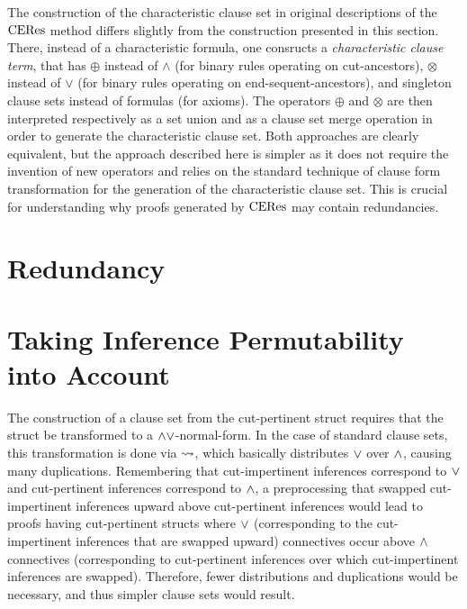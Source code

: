 \documentclass{llncs}
\begin{document}
The construction of the characteristic clause set in original descriptions of the $\mathrm{CERes}$ method \cite{BaazLeitsch1999MethodsofCut-Elimination,BaazLeitsch2000Cut-eliminationandRedundancy-eliminationbyResolution,BaazLeitsch2006Towardsaclausalanalysisofcut-elimination} differs slightly from the construction presented in this section. There, instead of a characteristic formula, one consructs a \emph{characteristic clause term}, that has $\oplus$ instead of $\wedge$ (for binary rules operating on cut-ancestors), $\otimes$ instead of $\vee$ (for binary rules operating on end-sequent-ancestors), and singleton clause sets instead of formulas (for axioms). The operators $\oplus$ and $\otimes$ are then interpreted respectively as a set union and as a clause set merge operation in order to generate the characteristic clause set. Both approaches are clearly equivalent, but the approach described here is simpler as it does not require the invention of new operators and relies on the standard technique of clause form transformation for the generation of the characteristic clause set. This is crucial for understanding why proofs generated by $\mathrm{CERes}$ may contain redundancies.


\section{Redundancy}
\label{sec:Redundancy}




\section{Taking Inference Permutability into Account}
\label{sec:InferencePermutability}

The construction of a clause set from the cut-pertinent struct requires that the struct be transformed to a $\wedge\vee$-normal-form. In the case of standard clause sets, this transformation is done via $\leadsto$, which basically distributes $\vee$ over $\wedge$, causing many duplications. Remembering that cut-impertinent inferences correspond to $\vee$ and cut-pertinent inferences correspond to $\wedge$, a preprocessing that swapped cut-impertinent inferences upward above cut-pertinent inferences would lead to proofs having cut-pertinent structs where $\vee$ (corresponding to the cut-impertinent inferences that are swapped upward) connectives occur above $\wedge$ connectives (corresponding to cut-pertinent inferences over which cut-impertinent inferences are swapped). Therefore, fewer distributions and duplications would be necessary, and thus simpler clause sets would result.
\end{document}
